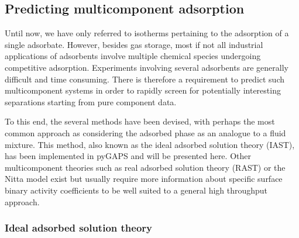 
\subsection{Predicting multicomponent adsorption}

Until now, we have only referred to isotherms pertaining to the adsorption
of a single adsorbate. However, besides gas storage, most if not all
industrial applications of adsorbents involve multiple chemical 
species undergoing competitive adsorption. Experiments involving
several adsorbents are generally difficult and time consuming.
There is therefore a requirement to predict such multicomponent systems
in order to rapidly screen for potentially interesting separations
starting from pure component data.

To this end, the several methods have been devised, with perhaps
the most common approach as considering the adsorbed phase as 
an analogue to a fluid mixture. This method, also known as the 
ideal adsorbed solution theory (IAST), has been implemented in
pyGAPS and will be presented here. Other multicomponent theories
such as real adsorbed solution theory (RAST) or the Nitta model
exist but usually require more information about specific
surface binary activity coefficients to be well suited to a
general high throughput approach.

\subsubsection{Ideal adsorbed solution theory}
